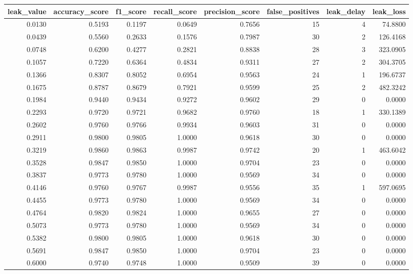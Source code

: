 \begin{tabular}{rrrrrrrr}
\toprule
leak\_value & accuracy\_score & f1\_score & recall\_score & precision\_score & false\_positives & leak\_delay & leak\_loss \\
\midrule
0.0130 & 0.5193 & 0.1197 & 0.0649 & 0.7656 & 15 & 4 & 74.8800 \\
0.0439 & 0.5560 & 0.2633 & 0.1576 & 0.7987 & 30 & 2 & 126.4168 \\
0.0748 & 0.6200 & 0.4277 & 0.2821 & 0.8838 & 28 & 3 & 323.0905 \\
0.1057 & 0.7220 & 0.6364 & 0.4834 & 0.9311 & 27 & 2 & 304.3705 \\
0.1366 & 0.8307 & 0.8052 & 0.6954 & 0.9563 & 24 & 1 & 196.6737 \\
0.1675 & 0.8787 & 0.8679 & 0.7921 & 0.9599 & 25 & 2 & 482.3242 \\
0.1984 & 0.9440 & 0.9434 & 0.9272 & 0.9602 & 29 & 0 & 0.0000 \\
0.2293 & 0.9720 & 0.9721 & 0.9682 & 0.9760 & 18 & 1 & 330.1389 \\
0.2602 & 0.9760 & 0.9766 & 0.9934 & 0.9603 & 31 & 0 & 0.0000 \\
0.2911 & 0.9800 & 0.9805 & 1.0000 & 0.9618 & 30 & 0 & 0.0000 \\
0.3219 & 0.9860 & 0.9863 & 0.9987 & 0.9742 & 20 & 1 & 463.6042 \\
0.3528 & 0.9847 & 0.9850 & 1.0000 & 0.9704 & 23 & 0 & 0.0000 \\
0.3837 & 0.9773 & 0.9780 & 1.0000 & 0.9569 & 34 & 0 & 0.0000 \\
0.4146 & 0.9760 & 0.9767 & 0.9987 & 0.9556 & 35 & 1 & 597.0695 \\
0.4455 & 0.9773 & 0.9780 & 1.0000 & 0.9569 & 34 & 0 & 0.0000 \\
0.4764 & 0.9820 & 0.9824 & 1.0000 & 0.9655 & 27 & 0 & 0.0000 \\
0.5073 & 0.9773 & 0.9780 & 1.0000 & 0.9569 & 34 & 0 & 0.0000 \\
0.5382 & 0.9800 & 0.9805 & 1.0000 & 0.9618 & 30 & 0 & 0.0000 \\
0.5691 & 0.9847 & 0.9850 & 1.0000 & 0.9704 & 23 & 0 & 0.0000 \\
0.6000 & 0.9740 & 0.9748 & 1.0000 & 0.9509 & 39 & 0 & 0.0000 \\
\bottomrule
\end{tabular}
